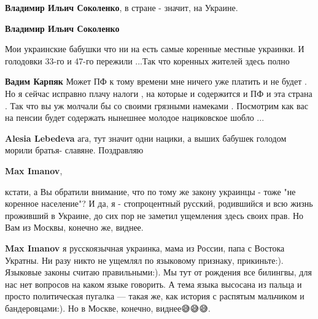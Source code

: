 \begin{itemize}
\begin{itemize}
\textbf{Владимир Ильич Соколенко}, в стране - значит, на Украине.

 
\textbf{Владимир Ильич Соколенко} 

Мои украинские бабушки что ни на есть самые коренные местные украинки. И
голодовки 33-го и 47-го пережили ...Так что коренных жителей здесь полно

 
\textbf{Вадим Карпяк} Может ПФ к тому времени мне ничего уже платить и не будет . Но я сейчас исправно плачу налоги , на которые и содержится и ПФ и эта страна . Так что вы уж молчали бы со своими грязными намеками . Посмотрим как вас на пенсии будет содержать нынешнее молодое нациковское шобло ...

 
\textbf{Alesia Lebedeva} ага, тут значит одни нацики, а выших бабушек голодом морили братья- славяне. Поздравляю

 
\textbf{Max Imanov}, 

кстати, а Вы обратили внимание, что по тому же закону украинцы - тоже "не
коренное население"? И да, я - стопроцентный русский, родившийся и всю жизнь
проживший в Украине, до сих пор не заметил ущемления здесь своих прав. Но Вам
из Москвы, конечно же, виднее.

 

\textbf{Max Imanov} я русскоязычная украинка, мама из России, папа с Востока Укратны\Smiley[1.0][yellow]. Ни разу никто не ущемлял по языковому признаку, прикиньте:). Языковые законы считаю правильными:). Мы тут от рождения все билингвы, для нас нет вопросов на каком языке говорить. А тема языка высосана из пальца и просто политическая пугалка — такая же, как история с распятым мальчиком и бандеровцами:). Но в Москве, конечно, виднее😅😅😅.


\end{itemize}
\end{itemize}
